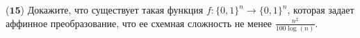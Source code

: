 ($\mathbf{15}$)
Докажите, что существует такая функция $f: \{0, 1\}^{n} \rightarrow \{0, 1\}^n$, которая задает аффинное преобразование, что
ее схемная сложность не менее $\frac{n^2}{100 \log(n)}$.